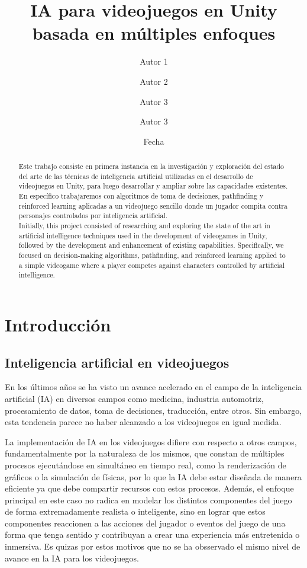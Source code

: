 \documentclass{article}
\title{IA para videojuegos en Unity basada en múltiples enfoques}
\author{Autor 1 \and Autor 2 \and Autor 3 \and Autor 3}
\date{Fecha}
\begin{document}
\maketitle

\begin{abstract}

    Este trabajo consiste en primera instancia en la investigación y exploración del estado del arte de las técnicas de inteligencia artificial utilizadas en el desarrollo de videojuegos en Unity, para luego desarrollar y ampliar sobre las capacidades existentes. En específico trabajaremos con algoritmos de toma de decisiones, pathfinding y reinforced learning aplicadas a un videojuego sencillo donde un jugador compita contra personajes controlados por inteligencia artificial.\\

    Initially, this project consisted of researching and exploring the state of the art in artificial intelligence techniques used in the development of videogames in Unity, followed by the development and enhancement of existing capabilities. Specifically, we focused on decision-making algorithms, pathfinding, and reinforced learning applied to a simple videogame where a player competes against characters controlled by artificial intelligence.

\end{abstract}

\section{Introducción}

\subsection{Inteligencia artificial en videojuegos}

En los últimos años se ha visto un avance acelerado en el campo de la inteligencia artificial (IA) en diversos campos como medicina, industria automotriz, procesamiento de datos, toma de decisiones, traducción, entre otros. Sin embargo, esta tendencia parece no haber alcanzado a los videojuegos en igual medida.

La implementación de IA en los videojuegos difiere con respecto a otros campos, fundamentalmente por la naturaleza de los mismos, que constan de múltiples procesos ejecutándose en simultáneo en tiempo real, como la renderización de gráficos o la simulación de físicas, por lo que la IA debe estar diseñada de manera eficiente ya que debe compartir recursos con estos procesos. Además, el enfoque principal en este caso no radica en modelar los distintos componentes del juego de forma extremadamente realista o inteligente, sino en lograr que estos componentes reaccionen a las acciones del jugador o eventos del juego de una forma que tenga sentido y contribuyan a crear una experiencia más entretenida o inmersiva. Es quizas por estos motivos que no se ha obsservado el mismo nivel de avance en la IA para los videojuegos.
\end{document}
